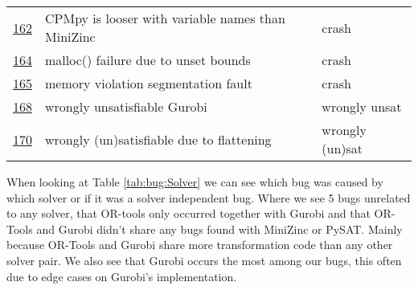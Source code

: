 \begin{table}[]
\begin{tabular}{lll}
		\href{https://github.com/CPMpy/cpmpy/issues/162}{162} & CPMpy is looser with variable names than MiniZinc & crash           \\
		\href{https://github.com/CPMpy/cpmpy/issues/164}{164} & malloc() failure due to unset bounds              & crash           \\
		\href{https://github.com/CPMpy/cpmpy/issues/165}{165} & memory violation segmentation fault               & crash           \\
		\href{https://github.com/CPMpy/cpmpy/issues/168}{168} & wrongly unsatisfiable Gurobi                      & wrongly unsat   \\
		\href{https://github.com/CPMpy/cpmpy/issues/170}{170} & wrongly (un)satisfiable due to flattening         & wrongly (un)sat \\ \bottomrule
	\end{tabular}
\end{table}

\label{res:SolverResponsible}
When looking at Table \ref{tab:bug:Solver} we can see which bug was caused by which solver or if it was a solver independent bug. Where we see 5 bugs unrelated to any solver, that OR-tools only occurred together with Gurobi and that OR-Tools and Gurobi didn’t share any bugs found with MiniZinc or PySAT. Mainly because OR-Tools and Gurobi share more transformation code than any other solver pair. We also see that Gurobi occurs the most among our bugs, this often due to edge cases on Gurobi’s implementation. %

